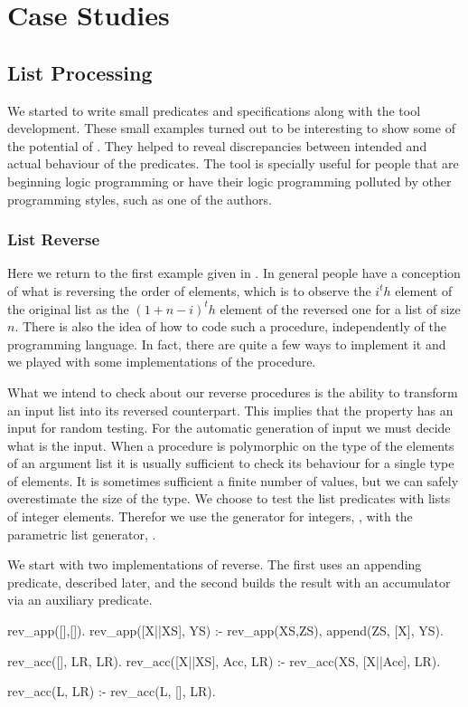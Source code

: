 
\section{Case Studies}
\label{sec:case-studies}

\subsection{List Processing}
We started to write small predicates and specifications along with the
tool development.
%
These small examples turned out to be interesting to show some of the
potential of \plqc{}.
%
They helped to reveal discrepancies between intended and actual
behaviour of the predicates.
%
The tool is specially useful for people that are beginning logic
programming or have their logic programming polluted by other
programming styles, such as one of the authors.



\subsubsection{List Reverse}
Here we return to the first example given in .
%
In general people have a conception of what is reversing the order of
elements, which is to observe the $i^th$ element of the original list as
the $(1+n-i)^th$ element of the reversed one for a list of size $n$.
%
There is also the idea of how to code such a procedure, independently of
the programming language.
%
In fact, there are quite a few ways to implement it and we played with
some implementations of the procedure.


What we intend to check about our reverse procedures is the ability to
transform an input list into its reversed counterpart.
%
This implies that the property has an input for random testing.
%
For the automatic generation of input we must decide what is the input.
%
When a procedure is polymorphic on the type of the elements of an
argument list it is usually sufficient to check its behaviour for a
single type of elements.
%
It is sometimes sufficient a finite number of values, but we can
safely overestimate the size of the type.
%
We choose to test the list predicates with lists of integer elements.
%
Therefor we use the generator for integers, , with the
parametric list generator, .


We start with two implementations of reverse.
%
The first uses an appending predicate, described later, and the second
builds the result with an accumulator via an auxiliary predicate.
%
\begin{yapcode}
 rev_app([],[]).
 rev_app([X||XS], YS) :-
   rev_app(XS,ZS), append(ZS, [X], YS).

 rev_acc([], LR, LR).
 rev_acc([X||XS], Acc, LR) :-
   rev_acc(XS, [X||Acc], LR).

 rev_acc(L, LR) :-
   rev_acc(L, [], LR).
\end{yapcode}


